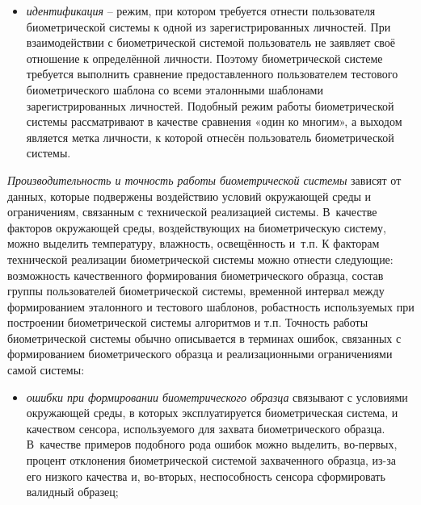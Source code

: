 \documentclass[12pt]{book}
\begin{document}
{\begin{itemize}[topsep=1pt]
\item \textit{идентификация} -- режим, при котором требуется отнести пользователя биометрической системы к одной из зарегистрированных личностей. При взаимодействии с биометрической системой пользователь не заявляет своё отношение к определённой личности. Поэтому биометрической системе требуется выполнить сравнение предоставленного пользователем тестового биометрического шаблона со всеми эталонными шаблонами зарегистрированных личностей. Подобный режим работы биометрической системы рассматривают в качестве сравнения «один ко многим», а выходом является метка личности, к которой отнесён пользователь биометрической системы.
\end{itemize}

\textit{Производительность и точность работы биометрической системы} зависят от данных, которые подвержены воздействию условий окружающей среды и ограничениям, связанным с технической реализацией системы. В~качестве факторов окружающей среды, воздействующих на биометрическую систему, можно выделить температуру, влажность, освещённость и~т.п. К факторам технической реализации биометрической системы можно отнести следующие: возможность качественного формирования биометрического образца, состав группы пользователей биометрической системы, временной интервал между формированием эталонного и тестового шаблонов, робастность используемых при построении биометрической системы алгоритмов и т.п. Точность работы биометрической системы обычно описывается в терминах ошибок, связанных с формированием биометрического образца и реализационными ограничениями самой системы:

\begin{itemize}[topsep=1pt] \itemsep0.1em
\item \textit{ошибки при формировании биометрического образца} связывают с условиями окружающей среды, в которых эксплуатируется биометрическая система, и качеством сенсора, используемого для захвата биометрического образца. В~качестве примеров подобного рода ошибок можно выделить, во-первых, процент отклонения биометрической системой захваченного образца, из-за его низкого качества и, во-вторых, неспособность сенсора сформировать валидный образец;


\end{itemize}}
\end{document}
